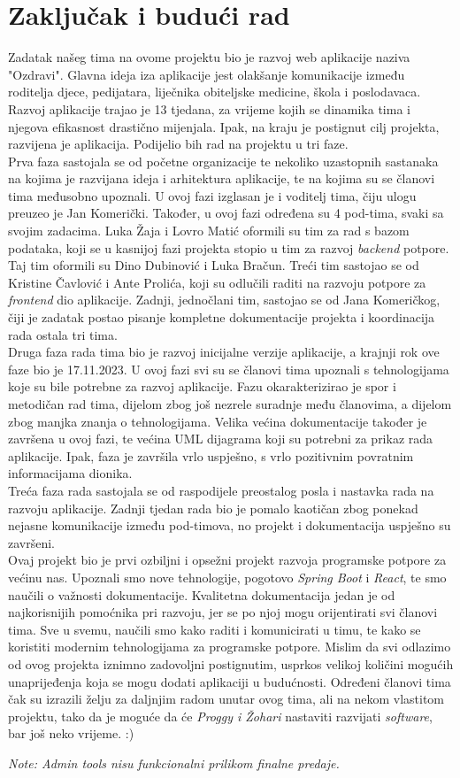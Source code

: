 \chapter{Zaključak i budući rad}
		
		\text Zadatak našeg tima na ovome projektu bio je razvoj web aplikacije naziva "Ozdravi". Glavna ideja iza aplikacije jest olakšanje komunikacije između roditelja djece, pedijatara, liječnika obiteljske medicine, škola i poslodavaca. Razvoj aplikacije trajao je 13 tjedana, za vrijeme kojih se dinamika tima i njegova efikasnost drastično mijenjala. Ipak, na kraju je postignut cilj projekta, razvijena je aplikacija. Podijelio bih rad na projektu u tri faze.\\
		Prva faza sastojala se od početne organizacije te nekoliko uzastopnih sastanaka na kojima je razvijana ideja i arhitektura aplikacije, te na kojima su se članovi tima međusobno upoznali. U ovoj fazi izglasan je i voditelj tima, čiju ulogu preuzeo je Jan Komerički. Također, u ovoj fazi određena su 4 pod-tima, svaki sa svojim zadacima. Luka Žaja i Lovro Matić oformili su tim za rad s bazom podataka, koji se u kasnijoj fazi projekta stopio u tim za razvoj \textit{backend} potpore. Taj tim oformili su Dino Dubinović i Luka Bračun. Treći tim sastojao se od Kristine Čavlović i Ante Prolića, koji su odlučili raditi na razvoju potpore za \textit{frontend} dio aplikacije. Zadnji, jednočlani tim, sastojao se od Jana Komeričkog, čiji je zadatak postao pisanje kompletne dokumentacije projekta i koordinacija rada ostala tri tima. \\
		Druga faza rada tima bio je razvoj inicijalne verzije aplikacije, a krajnji rok ove faze bio je 17.11.2023. U ovoj fazi svi su se članovi tima upoznali s tehnologijama koje su bile potrebne za razvoj aplikacije. Fazu okarakterizirao je spor i metodičan rad tima, dijelom zbog još nezrele suradnje među članovima, a dijelom zbog manjka znanja o tehnologijama. Velika većina dokumentacije također je završena u ovoj fazi, te većina UML dijagrama koji su potrebni za prikaz rada aplikacije. Ipak, faza je završila vrlo uspješno, s vrlo pozitivnim povratnim informacijama dionika.\\
		Treća faza rada sastojala se od raspodijele preostalog posla i nastavka rada na razvoju aplikacije. Zadnji tjedan rada bio je pomalo kaotičan zbog ponekad nejasne komunikacije između pod-timova, no projekt i dokumentacija uspješno su završeni.\\
		Ovaj projekt bio je prvi ozbiljni i opsežni projekt razvoja programske potpore za većinu nas. Upoznali smo nove tehnologije, pogotovo \textit{Spring Boot} i \textit{React}, te smo naučili o važnosti dokumentacije. Kvalitetna dokumentacija jedan je od najkorisnijih pomoćnika pri razvoju, jer se po njoj mogu orijentirati svi članovi tima. Sve u svemu, naučili smo kako raditi i komunicirati u timu, te kako se koristiti modernim tehnologijama za programske potpore. Mislim da svi odlazimo od ovog projekta iznimno zadovoljni postignutim, usprkos velikoj količini mogućih unaprijeđenja koja se mogu dodati aplikaciji u budućnosti. Određeni članovi tima čak su izrazili želju za daljnjim radom unutar ovog tima, ali na nekom vlastitom projektu, tako da je moguće da će \textit{Proggy i Žohari} nastaviti razvijati \textit{software}, bar još neko vrijeme. 
													:)
		
		\textit{Note: Admin tools nisu funkcionalni prilikom finalne predaje.}
		\eject 